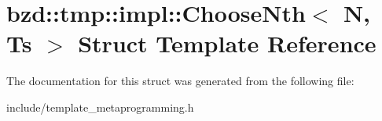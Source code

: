 \hypertarget{structbzd_1_1tmp_1_1impl_1_1ChooseNth}{}\section{bzd\+:\+:tmp\+:\+:impl\+:\+:Choose\+Nth$<$ N, Ts $>$ Struct Template Reference}
\label{structbzd_1_1tmp_1_1impl_1_1ChooseNth}


The documentation for this struct was generated from the following file\+:\begin{DoxyCompactItemize}
\item 
include/template\+\_\+metaprogramming.\+h\end{DoxyCompactItemize}
